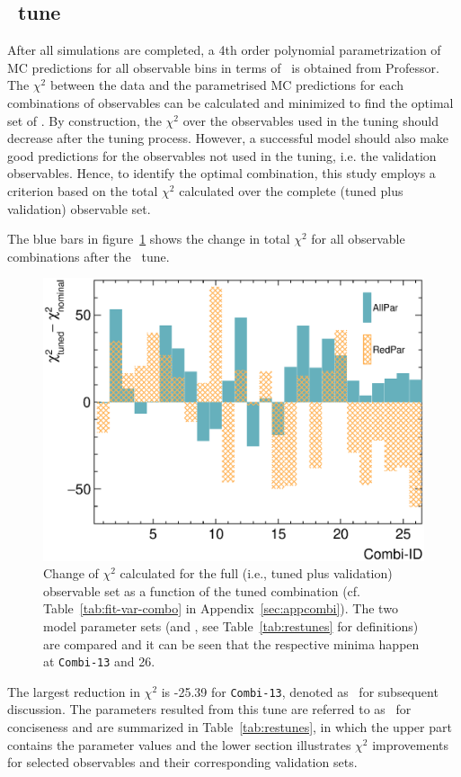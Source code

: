     \subsection{\allpar\ tune}
    After all simulations are completed, a 4th order polynomial parametrization of MC predictions for all observable bins in terms of \allpar\ is obtained from Professor.
    The $\chi^2$ between the data and the parametrised MC predictions for each combinations of observables can be calculated and minimized to find the optimal set of \allpar.
    By construction, the $\chi^2$ over the observables used in the tuning should decrease after the tuning process.
    However, a successful model should also make good predictions for the observables not used in the tuning, i.e. the validation observables.
    Hence, to identify the optimal combination, this study employs a criterion based on the total $\chi^2$ calculated over the complete (tuned plus validation) observable set.

    The blue bars in figure~\ref{fig:allchi} shows the change in total $\chi^2$ for all observable combinations after the \allbar\ tune.
    \begin{figure}[!htb] 
        \centering 		
        \includegraphics[width=\sgfigwid\textwidth]{figures/tuning/chi2_hist_covfix.eps} 
        \caption{\label{fig:allchi} Change of $\chi^2$ calculated for the full (i.e., tuned plus validation) observable set as a function of the tuned combination (cf. Table~\ref{tab:fit-var-combo} in Appendix~\ref{sec:appcombi}). The two model parameter sets (\allpar and \redpar, see Table~\ref{tab:restunes} for definitions) are compared and it can be seen that the respective minima happen at \texttt{Combi-13} and 26. }   
    \end{figure}
    The largest reduction in $\chi^2$ is -25.39 for \texttt{Combi-13}, denoted as \cbAllPar\ for subsequent discussion.
    The parameters resulted from this tune are referred to as \gT\ for conciseness and are summarized in Table~\ref{tab:restunes}, in which the upper part contains the parameter values and the lower section illustrates $\chi^2$ improvements for selected observables and their corresponding validation sets. 

